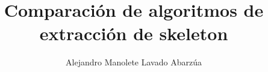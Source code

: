 \documentclass[spanish,letterpaper]{templates/uchile-tesis}
\title{Comparación de algoritmos de extracción de skeleton}
\author{Alejandro Manolete Lavado Abarzúa}
\begin{document}
\listoftodos
\newpage

\maketitle















\end{document}
